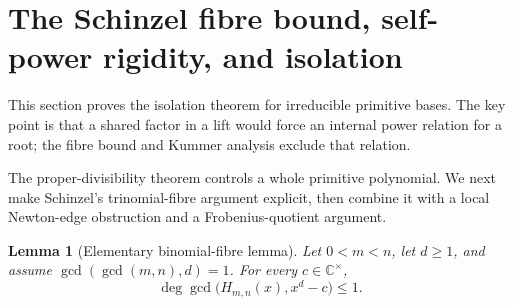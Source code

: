 \documentclass[11pt]{article}
\newtheorem{lemma}[theorem]{Lemma}
\theoremstyle{definition}
\newcommand{\C}{\mathbb C}
\begin{document}
\section{The Schinzel fibre bound, self-power rigidity, and isolation}

This section proves the isolation theorem for irreducible primitive bases.  The key point is that a shared factor in a lift would force an internal power relation for a root; the fibre bound and Kummer analysis exclude that relation.
\label{sec:kummer}

The proper-divisibility theorem controls a whole primitive polynomial.  We
next make Schinzel's trinomial-fibre argument explicit, then combine it with a
local Newton-edge obstruction and a Frobenius-quotient argument.

\begin{lemma}[Elementary binomial-fibre lemma]\label{lem:schinzelfibre}
Let \(0<m<n\), let \(d\geq1\), and assume
\(\gcd(\gcd(m,n),d)=1\).  For every \(c\in\C^\times\),
\[
 \deg\gcd\bigl(H_{m,n}(x),x^d-c\bigr)\leq1.
\]
\end{lemma}
\end{document}
